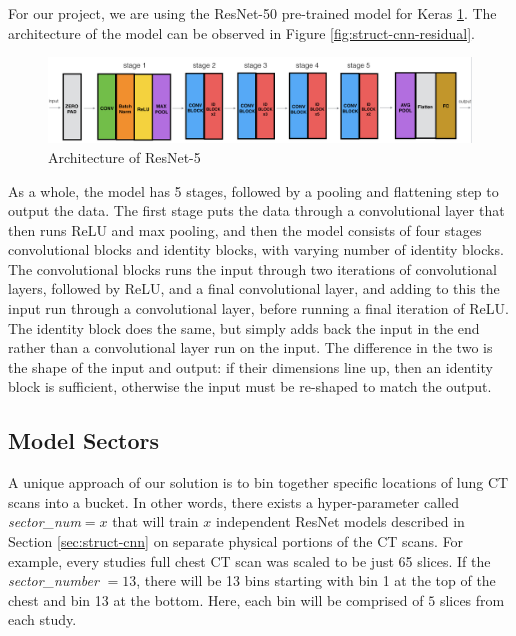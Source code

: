 \documentclass[10pt,twocolumn,letterpaper]{article}
\begin{document}
        For our project, we are using the ResNet-50 pre-trained model for Keras \ref{fig:struct-cnn-resnet}. The architecture of the model can be observed in Figure \ref{fig:struct-cnn-residual}.

        \begin{figure}
            \begin{center}
                \includegraphics[width=\textwidth]{./images/Resnet-50.png}
            \end{center}
            \caption{Architecture of ResNet-5}
            \label{fig:struct-cnn-resnet}
        \end{figure}

         As a whole, the model has 5 stages, followed by a pooling and flattening step to output the data. The first
         stage puts the data through a convolutional layer that then runs ReLU and max pooling, and then the model consists
         of four stages convolutional blocks and identity blocks, with varying number of identity blocks. The convolutional
         blocks runs the input through two iterations of convolutional layers, followed by ReLU, and a final convolutional
         layer, and adding to this the input run through a convolutional layer, before running a final iteration of ReLU.
         The identity block does the same, but simply adds back the input in the end rather than a convolutional layer run
         on the input. The difference in the two is the shape of the input and output: if their dimensions line up, then an
         identity block is sufficient, otherwise the input must be re-shaped to match the output.

   \subsection{Model Sectors} \label{sec:struct-sector}

        A unique approach of our solution is to bin together specific locations of lung CT scans into a bucket. In other words, there exists
        a hyper-parameter called {\it sector\_num}$=x$ that will train $x$ independent ResNet models described in Section \ref{sec:struct-cnn} on separate
        physical portions of the CT scans. For example, every studies full chest CT scan was scaled to be just 65 slices. If the {\it sector\_number} $=13$,
        there will be 13 bins starting with bin 1 at the top of the chest and bin 13 at the bottom. Here, each bin will be comprised
        of $5$ slices from each study.
\end{document}
